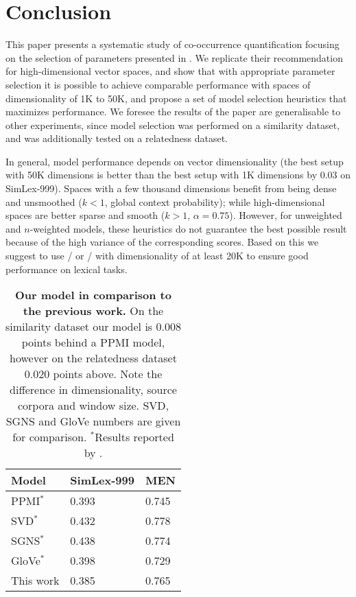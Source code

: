\documentclass[11pt]{article}
\begin{document}
\section{Conclusion}
\label{sec:conclusion}

This paper presents a systematic study of co-occurrence quantification focusing on the selection of parameters presented in . We replicate their recommendation for high-dimensional vector spaces, and show that with appropriate parameter selection it is possible to achieve comparable performance with spaces of dimensionality of 1K to 50K, and propose a set of model selection heuristics that maximizes performance. We foresee the results of the paper are generalisable to other experiments, since model selection was performed on a similarity dataset, and was additionally tested on a relatedness dataset.

In general, model performance depends on vector dimensionality (the best setup with 50K dimensions is better than the best setup with 1K dimensions by 0.03 on SimLex-999). Spaces with a few thousand dimensions benefit from being dense and unsmoothed  ($k < 1$, global context probability); while high-dimensional spaces are better sparse and smooth  ($k > 1$, $\alpha = 0.75$). However, for unweighted and $n$-weighted models, these heuristics do not guarantee the best possible result because of the high variance of the corresponding scores. Based on this we suggest to use \logNSPMI/ or \logNSCPMI/ with dimensionality of at least 20K to ensure good performance on lexical tasks.

\begin{table}
  \centering
  \begin{tabular}{lll}
    \toprule
    Model           & SimLex-999 & MEN \\
    \midrule
    PPMI$^*$        & 0.393      & 0.745 \\
    SVD$^*$         & 0.432      & 0.778 \\
    SGNS$^*$        & 0.438      & 0.774 \\
    GloVe$^*$       & 0.398      & 0.729 \\
    \addlinespace
    This work       & 0.385      & 0.765 \\
    \bottomrule
  \end{tabular}
  \caption{\textbf{Our model in comparison to the previous work.} On the similarity dataset our model is 0.008 points behind a PPMI model, however on the relatedness dataset 0.020 points above. Note the difference in dimensionality, source corpora and window size. SVD, SGNS and GloVe numbers are given for comparison. $^*$Results reported by .}
\label{tab:results}
\end{table}
\end{document}
